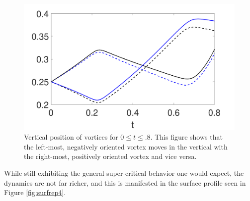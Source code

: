 \documentclass[a4paper,11pt]{article}
\begin{document}
\begin{figure}[!h]
\centering
\includegraphics[width=.75\textwidth]{ztrack_mu_pt2_F_1_tf_pt8_4vort}
\caption{Vertical position of vortices for $0\leq t \leq .8$.  This figure shows that the left-most, negatively oriented vortex moves in the vertical with the right-most, positively oriented vortex and vice versa.}
\end{figure}
While still exhibiting the general super-critical behavior one would expect, the dynamics are not far richer, and this is manifested in the surface profile seen in Figure \ref{fig:surfrep4}.



\end{document}
